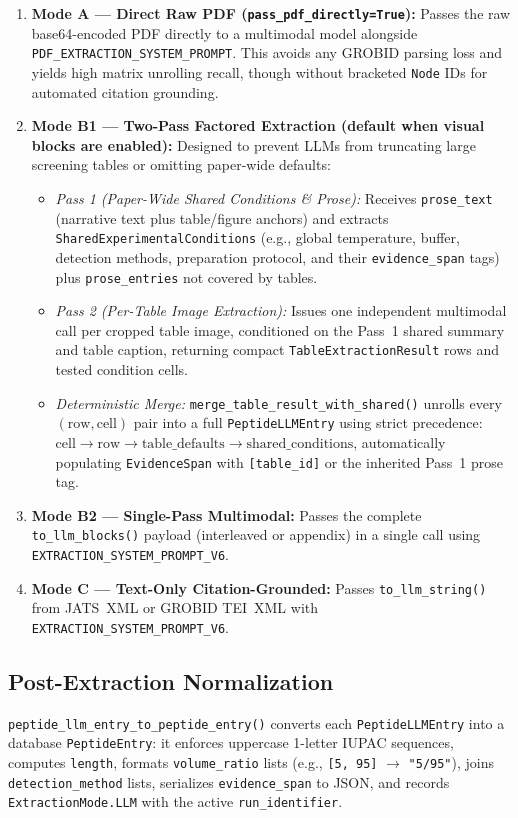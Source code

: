 \begin{enumerate}
    \item \textbf{Mode A --- Direct Raw PDF (\texttt{pass\_pdf\_directly=True}):} Passes the raw base64-encoded PDF directly to a multimodal model alongside \texttt{PDF\_EXTRACTION\_SYSTEM\_PROMPT}. This avoids any GROBID parsing loss and yields high matrix unrolling recall, though without bracketed \texttt{Node} IDs for automated citation grounding.
    \item \textbf{Mode B1 --- Two-Pass Factored Extraction (default when visual blocks are enabled):} Designed to prevent LLMs from truncating large screening tables or omitting paper-wide defaults:
    \begin{itemize}
        \item \emph{Pass 1 (Paper-Wide Shared Conditions \& Prose):} Receives \texttt{prose\_text} (narrative text plus table/figure anchors) and extracts \texttt{SharedExperimentalConditions} (e.g., global temperature, buffer, detection methods, preparation protocol, and their \texttt{evidence\_span} tags) plus \texttt{prose\_entries} not covered by tables.
        \item \emph{Pass 2 (Per-Table Image Extraction):} Issues one independent multimodal call per cropped table image, conditioned on the Pass~1 shared summary and table caption, returning compact \texttt{TableExtractionResult} rows and tested condition cells.
        \item \emph{Deterministic Merge:} \texttt{merge\_table\_result\_with\_shared()} unrolls every $(\text{row}, \text{cell})$ pair into a full \texttt{PeptideLLMEntry} using strict precedence: $\text{cell} \rightarrow \text{row} \rightarrow \text{table\_defaults} \rightarrow \text{shared\_conditions}$, automatically populating \texttt{EvidenceSpan} with \texttt{[table\_id]} or the inherited Pass~1 prose tag.
    \end{itemize}
    \item \textbf{Mode B2 --- Single-Pass Multimodal:} Passes the complete \texttt{to\_llm\_blocks()} payload (interleaved or appendix) in a single call using \texttt{EXTRACTION\_SYSTEM\_PROMPT\_V6}.
    \item \textbf{Mode C --- Text-Only Citation-Grounded:} Passes \texttt{to\_llm\_string()} from JATS~XML or GROBID TEI~XML with \texttt{EXTRACTION\_SYSTEM\_PROMPT\_V6}.
\end{enumerate}

\subsection{Post-Extraction Normalization}
\texttt{peptide\_llm\_entry\_to\_peptide\_entry()} converts each \texttt{PeptideLLMEntry} into a database \texttt{PeptideEntry}: it enforces uppercase 1-letter IUPAC sequences, computes \texttt{length}, formats \texttt{volume\_ratio} lists (e.g., \texttt{[5, 95]} $\rightarrow$ \texttt{"5/95"}), joins \texttt{detection\_method} lists, serializes \texttt{evidence\_span} to JSON, and records \texttt{ExtractionMode.LLM} with the active \texttt{run\_identifier}.
